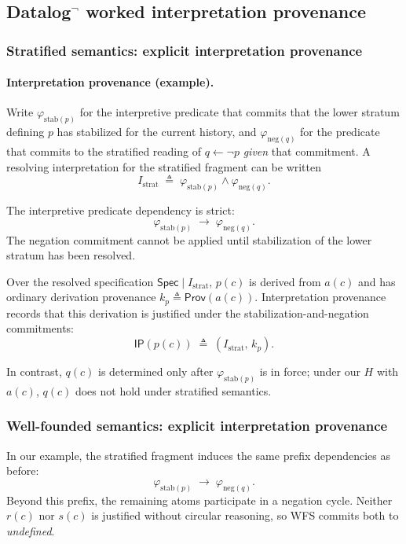 \documentclass[acmsmall,nonacm]{acmart}
\theoremstyle{remark}
\numberwithin{definition}{section}
\numberwithin{theorem}{section}
\numberwithin{lemma}{section}
\numberwithin{corollary}{section}
\numberwithin{remark}{section}
\numberwithin{example}{section}
\numberwithin{observation}{section}
\numberwithin{assumption}{section}
\newcommand{\Spec}{\mathsf{Spec}}
\newcommand{\Prov}{\mathsf{Prov}}
\begin{document}
\subsection{Datalog\texorpdfstring{$^{\neg}$}{ with negation} worked interpretation provenance}
\label{sec:appendix-datalog}

\subsubsection{Stratified semantics: explicit interpretation provenance}

\paragraph{Interpretation provenance (example).}
Write $\varphi_{\mathrm{stab}(p)}$ for the interpretive predicate that commits
that the lower stratum defining $p$ has stabilized for the current history, and
$\varphi_{\mathrm{neg}(q)}$ for the predicate that commits to the stratified
reading of $q \leftarrow \neg p$ \emph{given} that commitment.
A resolving interpretation for the stratified fragment can be written
\[
  I_{\mathrm{strat}} \;\triangleq\;
  \varphi_{\mathrm{stab}(p)} \wedge \varphi_{\mathrm{neg}(q)}.
\]

The interpretive predicate dependency is strict:
\[
  \varphi_{\mathrm{stab}(p)} \;\rightarrow\; \varphi_{\mathrm{neg}(q)}.
\]
The negation commitment cannot be applied until stabilization of the lower stratum
has been resolved.

Over the resolved specification $\Spec \mid I_{\mathrm{strat}}$, $p(c)$ is derived
from $a(c)$ and has ordinary derivation provenance
$k_p \triangleq \Prov(a(c))$.
Interpretation provenance records that this derivation is justified under the
stabilization-and-negation commitments:
\[
  \mathsf{IP}(p(c)) \;\triangleq\; (I_{\mathrm{strat}},\, k_p) .
\]

In contrast, $q(c)$ is determined only after $\varphi_{\mathrm{stab}(p)}$ is in
force; under our $H$ with $a(c)$, $q(c)$ does not hold under stratified semantics.

\subsubsection{Well-founded semantics: explicit interpretation provenance}

In our example, the stratified fragment induces the same prefix dependencies as
before:
\[
  \varphi_{\mathrm{stab}(p)} \;\rightarrow\; \varphi_{\mathrm{neg}(q)}.
\]
Beyond this prefix, the remaining atoms participate in a negation cycle.
Neither $r(c)$ nor $s(c)$ is justified without circular reasoning, so WFS commits both
to \emph{undefined}.
\end{document}
